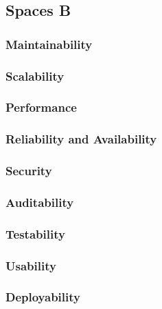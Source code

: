 \subsection{Spaces B}

\subsubsection{Maintainability}

\subsubsection{Scalability}

\subsubsection{Performance}

\subsubsection{Reliability and Availability}

\subsubsection{Security}

\subsubsection{Auditability}

\subsubsection{Testability}

\subsubsection{Usability}

\subsubsection{Deployability}